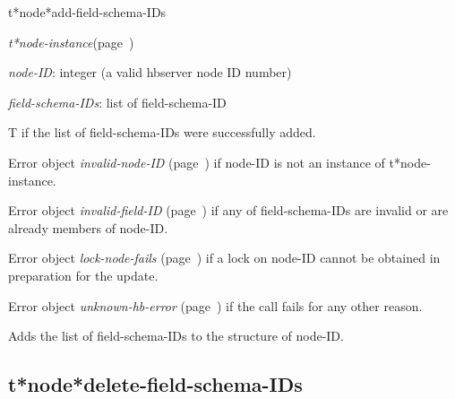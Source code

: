 \begin{description}
\item [Name:]  t*node*add-field-schema-IDs

\item [Class:] {\sl t*node-instance}\hfill(page~\pageref{t*node-instance})

\item [Parameters:]
\item {\sl node-ID}:  
integer (a valid hbserver node ID number)

\item {\sl field-schema-IDs}:  list of field-schema-ID


\item [Return-value:]
T if the list of field-schema-IDs were successfully added.

Error object {\sl invalid-node-ID} (page~\pageref{invalid-node-ID}) if node-ID is not an
instance of t*node-instance.

Error object {\sl invalid-field-ID} (page~\pageref{invalid-field-ID}) if any of 
field-schema-IDs are invalid or are already members of 
node-ID.

Error object {\sl lock-node-fails} (page~\pageref{lock-node-fails}) if a lock on node-ID
cannot be obtained in preparation for the update.

Error object {\sl unknown-hb-error} (page~\pageref{unknown-hb-error}) if the call fails
for any other reason. 

\item [Description:]

Adds the list of field-schema-IDs to the structure of
node-ID.

\item [Public:]



\end{description}
\horizontalline

\subsection{t*node*delete-field-schema-IDs}
\label{t*node*delete-field-schema-IDs}

